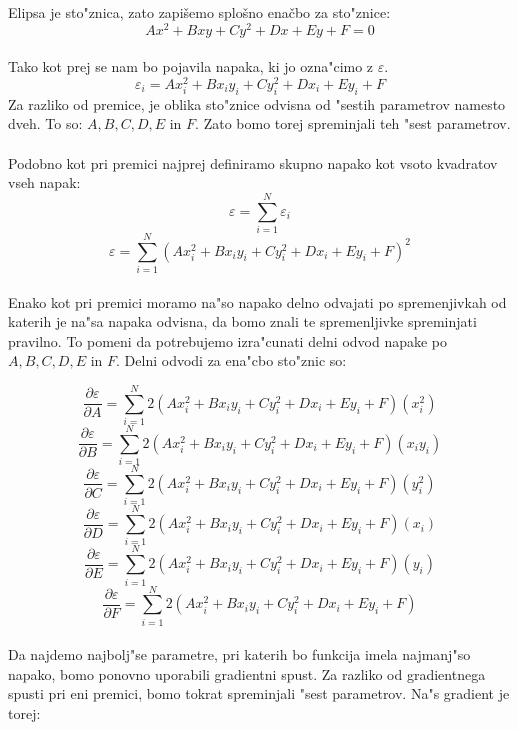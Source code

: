 \documentclass[a4paper, 12pt]{article}
\begin{document}
	
	Elipsa je sto"znica, zato zapišemo splošno enačbo za sto"znice:
	$$Ax^2 + Bxy + Cy^2 + Dx + Ey + F = 0$$
	
	\paragraph{}
	Tako kot prej se nam bo pojavila napaka, ki jo ozna"cimo z $\varepsilon$.
	$$\varepsilon_i = Ax_i^2 + Bx_iy_i + Cy_i^2 + Dx_i + Ey_i + F$$
	Za razliko od premice, je oblika sto"znice odvisna od "sestih parametrov namesto dveh. To so: $A, B, C, D, E$ in $F$. Zato bomo torej spreminjali teh "sest parametrov.
	
	\paragraph{}
	Podobno kot pri premici najprej definiramo skupno napako kot vsoto kvadratov vseh napak:
	\[\varepsilon = \sum_{i=1}^{N}\varepsilon_i\]
	\[\varepsilon = \sum_{i=1}^{N} (Ax_i^2 + Bx_iy_i + Cy_i^2 + Dx_i + Ey_i + F)^2\]
	
	\paragraph{}
	Enako kot pri premici moramo na"so napako delno odvajati po spremenjivkah od katerih je na"sa napaka odvisna, da bomo znali te spremenljivke spreminjati pravilno. To pomeni da potrebujemo izra"cunati delni odvod napake po $A, B, C, D, E$ in $F$. Delni odvodi za ena"cbo sto"znic so:
	
	$$\frac{\partial \varepsilon}{\partial A} = \sum_{i=1}^{N}2(Ax_i^2 + Bx_iy_i + Cy_i^2 + Dx_i + Ey_i + F)(x_i^2)$$
	$$\frac{\partial \varepsilon}{\partial B} = \sum_{i=1}^{N}2(Ax_i^2 + Bx_iy_i + Cy_i^2 + Dx_i + Ey_i + F)(x_iy_i)$$
	$$\frac{\partial \varepsilon}{\partial C} = \sum_{i=1}^{N}2(Ax_i^2 + Bx_iy_i + Cy_i^2 + Dx_i + Ey_i + F)(y_i^2)$$
	$$\frac{\partial \varepsilon}{\partial D} = \sum_{i=1}^{N}2(Ax_i^2 + Bx_iy_i + Cy_i^2 + Dx_i + Ey_i + F)(x_i)$$
	$$\frac{\partial \varepsilon}{\partial E} = \sum_{i=1}^{N}2(Ax_i^2 + Bx_iy_i + Cy_i^2 + Dx_i + Ey_i + F)(y_i)$$
	$$\frac{\partial \varepsilon}{\partial F} = \sum_{i=1}^{N}2(Ax_i^2 + Bx_iy_i + Cy_i^2 + Dx_i + Ey_i + F)$$
	
	\paragraph{}
	Da najdemo najbolj"se parametre, pri katerih bo funkcija imela najmanj"so napako, bomo ponovno uporabili gradientni spust. Za razliko od gradientnega spusti pri eni premici, bomo tokrat spreminjali "sest parametrov. Na"s gradient je torej:
	
\end{document}
